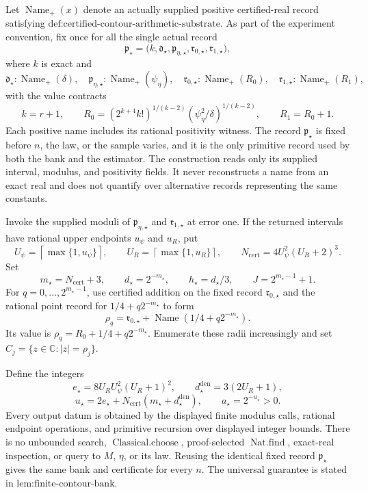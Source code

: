 Let \(\operatorname{Name}_{+}(x)\) denote an actually supplied positive certified-real record satisfying \(\text{def:certified-contour-arithmetic-substrate}\).  As part of the experiment convention, fix once for all the single actual record
\[
 \mathfrak p_{\star}=
 \bigl(k,\mathfrak d_{\star},\mathfrak p_{\eta,\star},
       \mathfrak r_{0,\star},\mathfrak r_{1,\star}\bigr),
\]
where \(k\) is exact and
\[
 \mathfrak d_{\star}:\operatorname{Name}_{+}(\delta),\quad
 \mathfrak p_{\eta,\star}:\operatorname{Name}_{+}(\psi_{\eta}),\quad
 \mathfrak r_{0,\star}:\operatorname{Name}_{+}(R_0),\quad
 \mathfrak r_{1,\star}:\operatorname{Name}_{+}(R_1),
\]
with the value contracts
\[
 k=r+1,\qquad
 R_0=(2^{k+4}k!)^{1/(k-2)}
       (\psi_{\eta}^2/\delta)^{1/(k-2)},
 \qquad R_1=R_0+1.
\]
Each positive name includes its rational positivity witness.  The record \(\mathfrak p_{\star}\) is fixed before \(n\), the law, or the sample varies, and it is the only primitive record used by both the bank and the estimator.  The construction reads only its supplied interval, modulus, and positivity fields.  It never reconstructs a name from an exact real and does not quantify over alternative records representing the same constants.

Invoke the supplied moduli of \(\mathfrak p_{\eta,\star}\) and \(\mathfrak r_{1,\star}\) at error one.  If the returned intervals have rational upper endpoints \(u_{\psi}\) and \(u_R\), put
\[
 U_{\psi}=\left\lceil\max\{1,u_{\psi}\}\right\rceil,
 \qquad
 U_R=\left\lceil\max\{1,u_R\}\right\rceil,
 \qquad
 N_{\mathrm{cert}}=4U_{\psi}^2(U_R+2)^3.
\]
Set
\[
 m_{\star}=N_{\mathrm{cert}}+3,
 \qquad d_{\star}=2^{-m_{\star}},
 \qquad h_{\star}=d_{\star}/3,
 \qquad J=2^{m_{\star}-1}+1.
\]
For \(q=0,\ldots,2^{m_{\star}-1}\), use certified addition on the fixed record \(\mathfrak r_{0,\star}\) and the rational point record for \(1/4+q2^{-m_{\star}}\) to form
\[
 \mathfrak\rho_q
 =\mathfrak r_{0,\star}+\operatorname{Name}(1/4+q2^{-m_{\star}}).
\]
Its value is \(\rho_q=R_0+1/4+q2^{-m_{\star}}\).  Enumerate these radii increasingly and set \(C_j=\{z\in\mathbb C:|z|=\rho_j\}\).

Define the integers
\[
 e_{\star}=8U_RU_{\psi}^2(U_R+1)^2,
 \qquad
 d_{\star}^{\mathrm{den}}=3(2U_R+1),
\]
\[
 u_{\star}=2e_{\star}
 +N_{\mathrm{cert}}(m_{\star}+d_{\star}^{\mathrm{den}}),
 \qquad
 a_{\star}=2^{-u_{\star}}>0.
\]
Every output datum is obtained by the displayed finite modulus calls, rational endpoint operations, and primitive recursion over displayed integer bounds.  There is no unbounded search, \(\operatorname{Classical.choose}\), proof-selected \(\operatorname{Nat.find}\), exact-real inspection, or query to \(M\), \(\eta\), or its law.  Reusing the identical fixed record \(\mathfrak p_{\star}\) gives the same bank and certificate for every \(n\).  The universal guarantee is stated in \(\text{lem:finite-contour-bank}\).